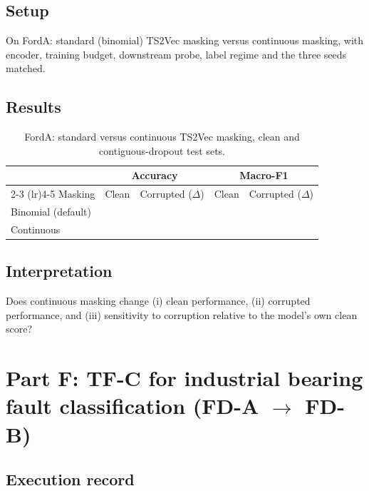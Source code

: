 \documentclass[a4paper,11pt]{article}
\newcommand{\TODOfill}{\todo[inline]{Fill in.}}
\begin{document}
\subsection{Setup}
On FordA: standard (binomial) TS2Vec masking versus continuous masking, with encoder,
training budget, downstream probe, label regime and the three seeds matched.
\TODOfill

\subsection{Results}

\begin{table}[h]
    \centering
    \small
    \begin{tabular}{l c c c c}
        \toprule
        & \multicolumn{2}{c}{Accuracy} & \multicolumn{2}{c}{Macro-F1} \\
        \cmidrule(lr){2-3} \cmidrule(lr){4-5}
        Masking & Clean & Corrupted ($\Delta$) & Clean & Corrupted ($\Delta$) \\
        \midrule
        Binomial (default) & & & & \\
        Continuous         & & & & \\
        \bottomrule
    \end{tabular}
    \caption{FordA: standard versus continuous TS2Vec masking, clean and contiguous-dropout test sets.}
    \label{tab:masking-ablation}
\end{table}

\subsection{Interpretation}
Does continuous masking change (i) clean performance, (ii) corrupted performance, and
(iii) sensitivity to corruption relative to the model's own clean score?
\TODOfill

\section{Part F: TF-C for industrial bearing fault classification (FD-A $\rightarrow$ FD-B)}

\subsection{Execution record}
\end{document}
